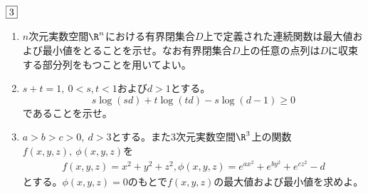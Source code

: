 \begin{tcolorbox} %
	$\fbox{3}$
\begin{enumerate}
	\item $n$次元実数空間$\R^n$における有界閉集合$D$上で定義された連続関数は最大値および最小値をとることを示せ。なお有界閉集合$D$上の任意の点列は$D$に収束する部分列をもつことを用いてよい。
	\item $s+ t= 1,\ 0< s, t< 1$および$d> 1$とする。
\begin{equation*}
	s\log{(sd)}+ t\log{(td)}- s\log{(d- 1)}\ge 0
\end{equation*}
	であることを示せ。

	\item $a> b> c> 0,\ d> 3$とする。また3次元実数空間$\R^3$上の関数$f(x, y, z),\ \phi(x, y, z)$を
\begin{align*}
	f(x, y, z)= x^2+ y^2+ z^2,
	\phi(x, y, z)= e^{ax^2}+ e^{by^2}+ e^{cz^2}- d
\end{align*}
	とする。$\phi(x, y, z)= 0$のもとで$f(x, y, z)$の最大値および最小値を求めよ。
\end{enumerate}
\end{tcolorbox}

